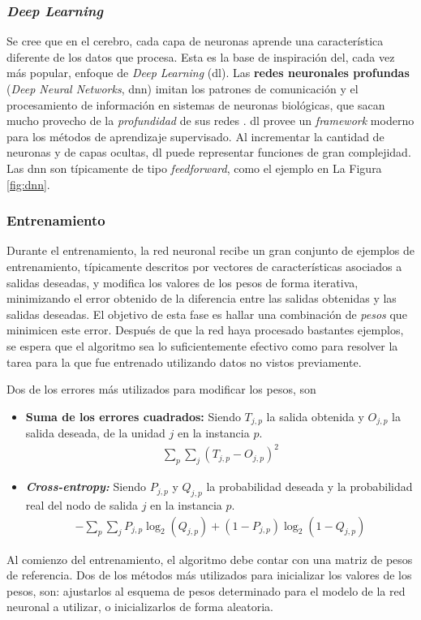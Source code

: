 \subsubsection{\emph{Deep Learning}}

Se cree que en el cerebro, cada capa de neuronas aprende una característica diferente de los datos que procesa. Esta es la base de inspiración del, cada vez más popular, enfoque de \emph{Deep Learning} (\acrshort{dl}). Las \textbf{redes neuronales profundas} (\emph{Deep Neural Networks}, \acrshort{dnn}) imitan los patrones de comunicación y el procesamiento de información en sistemas de neuronas biológicas, que sacan mucho provecho de la \textit{profundidad} de sus redes \cite{Aggarwal}.
%
\acrshort{dl} provee un \emph{framework} moderno para los métodos de aprendizaje supervisado. Al incrementar la cantidad de neuronas y de capas ocultas, \acrshort{dl} puede representar funciones de gran complejidad. Las \acrshort{dnn} son típicamente de tipo \emph{feedforward}, como el ejemplo en La Figura \ref{fig:dnn}.



\subsubsection{Entrenamiento}

Durante el entrenamiento, la red neuronal recibe un gran conjunto de ejemplos de entrenamiento, típicamente descritos por vectores de características asociados a salidas deseadas, y modifica los valores de los pesos de forma iterativa, minimizando el error obtenido de la diferencia entre las salidas obtenidas y las salidas deseadas. El objetivo de esta fase es hallar una combinación de \textit{pesos} que minimicen este error. Después de que la red haya procesado bastantes ejemplos, se espera que el algoritmo sea lo suficientemente efectivo como para resolver la tarea para la que fue entrenado \cite{Buduma} utilizando datos no vistos previamente.
%

Dos de los errores más utilizados para modificar los pesos, son
\begin{itemize}
    \item \textbf{Suma de los errores cuadrados:} Siendo $T_{j,p}$ la salida obtenida y $O_{j,p}$ la salida deseada, de la unidad $j$ en la instancia $p$.
    \begin{align*}
    \sum_p \sum_j (T_{j,p} - O_{j,p})^2
    \end{align*}
    \item \textbf{\emph{Cross-entropy:}}  Siendo $P_{j,p}$ y $Q_{j,p}$ la probabilidad deseada y la probabilidad real del nodo de salida $j$ en la instancia $p$.
    \begin{align*}
    - \sum_p \sum_j P_{j,p}\log_2(Q_{j,p})+(1-P_{j,p})\log_2(1-Q_{j,p})
    \end{align*}
\end{itemize}
%
Al comienzo del entrenamiento, el algoritmo debe contar con una matriz de pesos de referencia. Dos de los métodos más utilizados para inicializar los valores de los pesos, son: ajustarlos al esquema de pesos determinado para el modelo de la red neuronal a utilizar, o inicializarlos de forma aleatoria.
%


